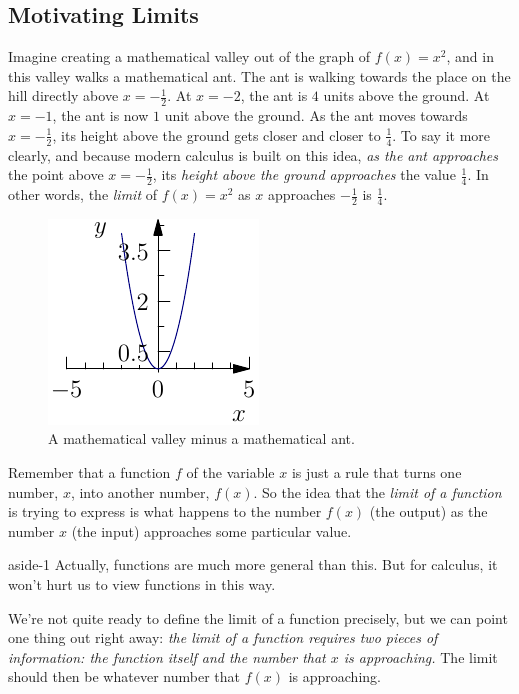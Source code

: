 \documentclass[10pt,]{book}
\numberwithin{equation}{section}
\begin{document}
\subsection[{Motivating Limits}]{Motivating Limits}\label{subsection-motivating-limits}
\hypertarget{p-2}{}%
Imagine creating a mathematical valley out of the graph of \(f(x) = x^{2}\), and in this valley walks a mathematical ant. The ant is walking towards the place on the hill directly above \(x = -\frac{1}{2}\). At \(x=-2\), the ant is \(4\) units above the ground. At \(x=-1\), the ant is now \(1\) unit above the ground. As the ant moves towards \(x=-\frac{1}{2}\), its height above the ground gets closer and closer to \(\frac{1}{4}\). To say it more clearly, and because modern calculus is built on this idea, \emph{as the ant approaches} the point above \(x = -\frac{1}{2}\), its \emph{height above the ground approaches} the value \(\frac{1}{4}\). In other words, the \emph{limit} of \(f(x) = x^{2}\) as \(x\) approaches \(-\frac{1}{2}\) is \(\frac{1}{4}\).%
\begin{figure}
\centering
\includegraphics[width=0.5\linewidth]{images/image-1.pdf}
\caption{A mathematical valley minus a mathematical ant.\label{figure-math-valley}}
\end{figure}
\hypertarget{p-3}{}%
Remember that a function \(f\) of the variable \(x\) is just a rule that turns one number, \(x\), into another number, \(f(x)\). So the idea that the \emph{limit of a function} is trying to express is what happens to the number \(f(x)\) (the output) as the number \(x\) (the input) approaches some particular value.%
\begin{aside}{}{aside-1}%
\hypertarget{p-4}{}%
Actually, functions are much more general than this. But for calculus, it won't hurt us to view functions in this way.%
\end{aside}
\hypertarget{p-5}{}%
We're not quite ready to define the limit of a function precisely, but we can point one thing out right away: \emph{the limit of a function requires two pieces of information: the function itself and the number that \(x\) is approaching.} The limit should then be whatever number that \(f(x)\) is approaching.%
\end{document}
